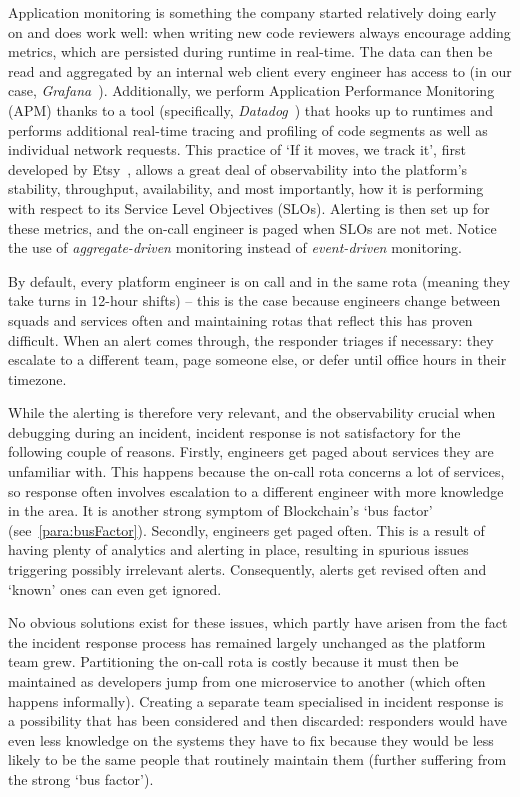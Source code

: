 \documentclass[conference]{IEEEtran}
\begin{document}
    Application monitoring is something the company started relatively doing early on and does work well: when writing new code reviewers always encourage adding metrics, which are persisted during runtime in real-time.
    The data can then be read and aggregated by an internal web client every engineer has access to (in our case, \textit{Grafana}~\cite{grafana}).
    Additionally, we perform Application Performance Monitoring (APM) thanks to a tool (specifically, \textit{Datadog}~\cite{datadogApm}) that hooks up to runtimes and performs additional real-time tracing and profiling of code segments as well as individual network requests.
    This practice of `If it moves, we track it', first developed by Etsy~\cite{etsyStatsd}, allows a great deal of observability into the platform's stability, throughput, availability, and most importantly, how it is performing with respect to its Service Level Objectives (SLOs).
    Alerting is then set up for these metrics, and the on-call engineer is paged when SLOs are not met.
    Notice the use of \emph{aggregate-driven} monitoring instead of \emph{event-driven} monitoring.

    By default, every platform engineer is on call and in the same rota (meaning they take turns in 12-hour shifts) -- this is the case because engineers change between squads and services often and maintaining rotas that reflect this has proven difficult.
    When an alert comes through, the responder triages if necessary: they escalate to a different team, page someone else, or defer until office hours in their timezone.

    While the alerting is therefore very relevant, and the observability crucial when debugging during an incident, incident response is not satisfactory for the following couple of reasons.
    Firstly, engineers get paged about services they are unfamiliar with.
    This happens because the on-call rota concerns a lot of services, so response often involves escalation to a different engineer with more knowledge in the area.
    It is another strong symptom of Blockchain's `bus factor' (see~\ref{para:busFactor}).
    Secondly, engineers get paged often.
    This is a result of having plenty of analytics and alerting in place, resulting in spurious issues triggering possibly irrelevant alerts.
    Consequently, alerts get revised often and `known' ones can even get ignored.

    No obvious solutions exist for these issues, which partly have arisen from the fact the incident response process has remained largely unchanged as the platform team grew.
    Partitioning the on-call rota is costly because it must then be maintained as developers jump from one microservice to another (which often happens informally).
    Creating a separate team specialised in incident response is a possibility that has been considered and then discarded: responders would have even less knowledge on the systems they have to fix because they would be less likely to be the same people that routinely maintain them (further suffering from the strong `bus factor').
\end{document}
